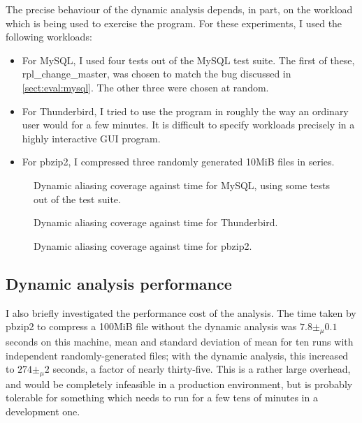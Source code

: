 The precise behaviour of the dynamic analysis depends, in part, on the
workload which is being used to exercise the program.  For these
experiments, I used the following workloads:

\begin{itemize}
\item For MySQL, I used four tests out of the MySQL test suite. The
  first of these, rpl\_change\_master, was chosen to match the bug
  discussed in \autoref{sect:eval:mysql}.  The other three were chosen
  at random.
\item For Thunderbird, I tried to use the program in roughly the way
  an ordinary user would for a few minutes.  It is difficult to
  specify workloads precisely in a highly interactive GUI
  program.
\item For pbzip2, I compressed three randomly generated 10MiB files in
  series.
\end{itemize}

\begin{figure}
  \caption{Dynamic aliasing coverage against time for MySQL, using
    some tests out of the test suite.}
  \label{fig:eval:dyn_convergence:mysqld}
\end{figure}

\begin{figure}
  
  \caption{Dynamic aliasing coverage against time for Thunderbird.}
  \label{fig:eval:dyn_convergence:thunderbird}
\end{figure}

\begin{figure}
  
  \caption{Dynamic aliasing coverage against time for pbzip2.}
  \label{fig:eval:dyn_convergence:pbzip2}
\end{figure}

\subsection{Dynamic analysis performance}

I also briefly investigated the performance cost of the analysis.  The
time taken by pbzip2 to compress a 100MiB file without the dynamic
analysis was $7.8 \pm_\mu 0.1$ seconds on this machine, mean and standard
deviation of mean for ten runs with independent randomly-generated
files; with the dynamic analysis, this increased to $274 \pm_\mu 2$
seconds, a factor of nearly thirty-five.  This is a rather large
overhead, and would be completely infeasible in a production
environment, but is probably tolerable for something which needs to
run for a few tens of minutes in a development one.

